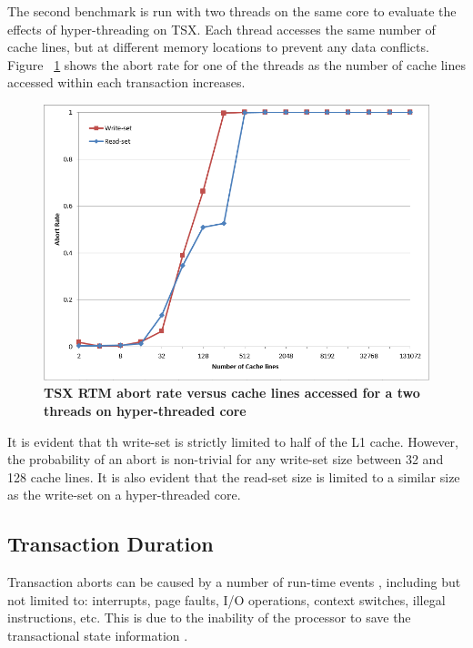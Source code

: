 \documentclass[a4paper]{article}
\begin{document}
\indent 
The second benchmark is run with two threads on the same core to
evaluate the effects of hyper-threading on TSX.  Each thread accesses the same
number of cache lines, but at different memory locations to prevent any data
conflicts. Figure ~\ref{fig:trx_size_ht} shows the abort rate for one 
of the threads as the number of cache lines accessed within each transaction
increases.
\par

\begin{figure}[H]
    \centering
    \graphicspath{ {./figures/} }
    \includegraphics[width=\textwidth,height=\textheight,keepaspectratio]{trx_size_ht}
    \caption{\textbf{TSX RTM abort rate versus cache lines accessed for a two 
    threads on hyper-threaded core}}
    \label{fig:trx_size_ht}
\end{figure}

\indent 
It is evident that th write-set is strictly limited to half of the L1
cache.  However, the probability of an abort is non-trivial for any write-set
size between 32 and 128 cache lines.  It is also evident that the read-set size
is limited to a similar size as the write-set on a hyper-threaded core.
\par

\subsection{\textbf{Transaction Duration}}

\indent 
Transaction aborts can be caused by a number of run-time events
\cite{intel_prog_ref}, including but not limited to: interrupts, page faults,
I/O operations, context switches, illegal instructions, etc.  This is due to the
inability of the processor to save the transactional state information
\cite{schwahn}.
\par
\end{document}

